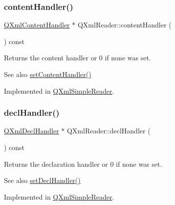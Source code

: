 \subsubsection{\texorpdfstring{contentHandler()}{contentHandler()}}
{\footnotesize\ttfamily \mbox{\hyperlink{class_q_xml_content_handler}{Q\+Xml\+Content\+Handler}} $\ast$ Q\+Xml\+Reader\+::content\+Handler (\begin{DoxyParamCaption}{ }\end{DoxyParamCaption}) const\hspace{0.3cm}{\ttfamily [pure virtual]}}

Returns the content handler or 0 if none was set.

\begin{DoxySeeAlso}{See also}
\mbox{\hyperlink{class_q_xml_reader_a767bc5a20ea120ffc2d60f5c42fb28cd}{set\+Content\+Handler()}} 
\end{DoxySeeAlso}


Implemented in \mbox{\hyperlink{class_q_xml_simple_reader_ad2c6d2fd753e261308e7171e25a40d37}{Q\+Xml\+Simple\+Reader}}.

\mbox{\label{class_q_xml_reader_a635ea0540ef702ccd0db0a15958d3fea}} 
\subsubsection{\texorpdfstring{declHandler()}{declHandler()}}
{\footnotesize\ttfamily \mbox{\hyperlink{class_q_xml_decl_handler}{Q\+Xml\+Decl\+Handler}} $\ast$ Q\+Xml\+Reader\+::decl\+Handler (\begin{DoxyParamCaption}{ }\end{DoxyParamCaption}) const\hspace{0.3cm}{\ttfamily [pure virtual]}}

Returns the declaration handler or 0 if none was set.

\begin{DoxySeeAlso}{See also}
\mbox{\hyperlink{class_q_xml_reader_a6d16a9420620f829cacb2cdb256d80a7}{set\+Decl\+Handler()}} 
\end{DoxySeeAlso}


Implemented in \mbox{\hyperlink{class_q_xml_simple_reader_abf978e05e6844e5eaa983eeb39581b16}{Q\+Xml\+Simple\+Reader}}.

\mbox{\label{class_q_xml_reader_a5c40696cea43c1af838e575b7cf7921c}} 
